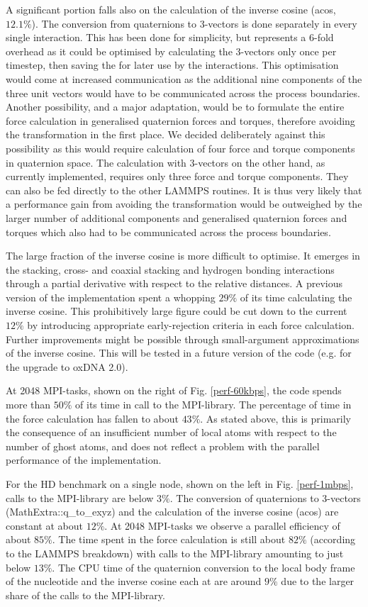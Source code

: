 \documentclass[12pt,onecolumn]{article}
\begin{document}
A significant portion falls also on the calculation of the inverse cosine (acos, $12.1\%$). 
The conversion from quaternions to 3-vectors is done separately in every single interaction. 
This has been done for simplicity, but represents a 6-fold overhead as it could be optimised by calculating the 3-vectors only once per timestep,
then saving the for later use by the interactions. This optimisation would come at increased communication as the additional nine
components of the three unit vectors would have to be communicated across the process boundaries.
Another possibility, and a major adaptation, would be to formulate the entire force calculation in generalised quaternion forces and torques, 
therefore avoiding the transformation in the first place. We decided deliberately against this possibility as this would require 
calculation of four force and torque components in quaternion space. The calculation with 3-vectors on the other hand, as currently implemented, 
requires only three force and torque components. They can also be fed directly to the other LAMMPS routines. It is thus very likely 
that a performance gain from avoiding the transformation would be outweighed by the larger number of additional components and generalised
quaternion forces and torques which also had to be communicated across the process boundaries.

The large fraction of the inverse cosine is more difficult to optimise. It emerges in the stacking, cross- and coaxial stacking
and hydrogen bonding interactions through a partial derivative with respect to the relative distances. A previous version of the 
implementation spent a whopping $29\%$ of its time calculating the inverse cosine. This prohibitively large figure could be 
cut down to the current $12 \%$ by introducing appropriate early-rejection criteria in each force calculation. Further improvements
might be possible through small-argument approximations of the inverse cosine. This will be tested in a future version
of the code (e.g. for the upgrade to oxDNA 2.0).

At 2048 MPI-tasks, shown on the right of Fig. \ref{perf-60kbps}, the code spends more than $50\%$ of its time in call to the MPI-library.
The percentage of time in the force calculation has fallen to about $43\%$. As stated above, this is primarily the consequence of 
an insufficient number of local atoms with respect to the number of ghost atoms, and does not reflect a problem with the 
parallel performance of the implementation.  

For the HD benchmark on a single node, shown on the left in Fig. \ref{perf-1mbps}, calls to the MPI-library are below $3\%$.
The conversion of quaternions to 3-vectors (MathExtra::q\_to\_exyz) and the calculation of the inverse cosine (acos) are constant 
at about $12\%$. At 2048 MPI-tasks we observe a parallel efficiency of about $85\%$. The time spent in the force calculation is
still about $82\%$ (according to the LAMMPS breakdown) with calls to the MPI-library amounting to just below $13\%$. 
The CPU time of the quaternion conversion to the local body frame of the nucleotide and the inverse cosine each at are around $9\%$ 
due to the larger share of the calls to the MPI-library.
\end{document}
